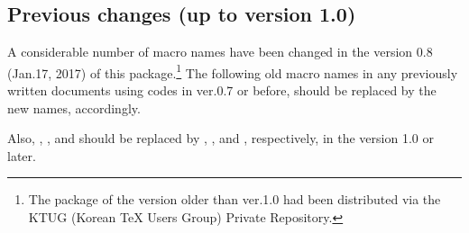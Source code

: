 \subsection{Previous changes (up to version 1.0)}

A considerable number of macro names have been changed in the version 0.8 (Jan.\@ 17, 2017) of this package.\footnote{The  package of the version older than ver.\@ 1.0 had been distributed via the KTUG (Korean TeX Users Group) Private Repository.}
The following old macro names in any previously written documents using codes in  ver.\@ 0.7 or before, should be replaced by the new names, accordingly. 

Also, \cmd{\istroot*}, \cmd{\istcntm*}, and \cmd{\xtInfoset*} should be replaced by \cmd{\istrooto}, \cmd{\istcntmarc}, and \cmd{\xtInfoseto}, respectively, in the version 1.0 or later.


